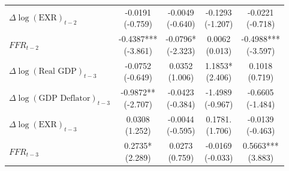 \documentclass[12pt]{article}
\begin{document}
\begin{enumerate}[label=\arabic*.]
\begin{table}[htbp]
\begin{tabular}{lcccc}
        $\Delta\log(\text{EXR})_{t-2}$
        & \makecell{-0.0191\\(-0.759)}
        & \makecell{-0.0049\\(-0.640)}
        & \makecell{-0.1293\\(-1.207)}
        & \makecell{-0.0221\\(-0.718)} \\
        
        $FFR_{t-2}$
        & \makecell{-0.4387***\\(-3.861)}
        & \makecell{-0.0796*\\(-2.323)}
        & \makecell{0.0062\\(0.013)}
        & \makecell{-0.4988***\\(-3.597)} \\
        
        $\Delta\log(\text{Real GDP})_{t-3}$
        & \makecell{-0.0752\\(-0.649)}
        & \makecell{0.0352\\(1.006)}
        & \makecell{1.1853*\\(2.406)}
        & \makecell{0.1018\\(0.719)} \\
        
        $\Delta\log(\text{GDP Deflator})_{t-3}$
        & \makecell{-0.9872**\\(-2.707)}
        & \makecell{-0.0423\\(-0.384)}
        & \makecell{-1.4989\\(-0.967)}
        & \makecell{-0.6605\\(-1.484)} \\
        
        $\Delta\log(\text{EXR})_{t-3}$
        & \makecell{0.0308\\(1.252)}
        & \makecell{-0.0044\\(-0.595)}
        & \makecell{0.1781.\\(1.706)}
        & \makecell{-0.0139\\(-0.463)} \\
        
        $FFR_{t-3}$
        & \makecell{0.2735*\\(2.289)}
        & \makecell{0.0273\\(0.759)}
        & \makecell{-0.0169\\(-0.033)}
        & \makecell{0.5663***\\(3.883)} \\
        

\end{tabular}
\end{table}
\end{enumerate}
\end{document}
